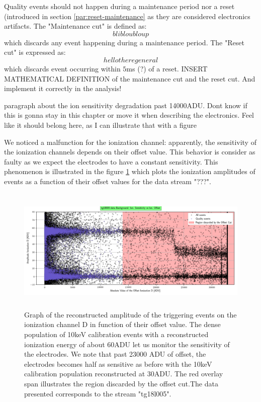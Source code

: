 Quality events should not happen during a maintenance period nor a reset (introduced in section \ref{par:reset-maintenance} as they are considered electronics artifacts. The "Maintenance cut" is defined as:
$$ bli blou bloup$$
which discards any event happening during a maintenance period.
The "Reset cut" is expressed as:
$$ hello there general$$
which discards event occurring within $5$ms (?) of a reset. 
{\color{red} INSERT MATHEMATICAL DEFINITION of the maintenance cut and the reset cut. And implement it correctly in the analysis! }

{\color{red} paragraph about the ion sensitivity degradation past 14000ADU. Dont know if this is gonna stay in this chapter or move it when describing the electronics. Feel like it should belong here, as I can illustrate that with a figure}

We noticed a malfunction for the ionization channel: apparently, the sensitivity of the ionization channels depends on their offset value. This behavior is consider as faulty as we expect the electrodes to have a constant sensitivity. This phenomenon is illustrated in the figure \ref{fig:offset-problem} which plots the ionization amplitudes of events as a function of their offset values for the data stream "???".

\begin{figure}
\centering
\includegraphics[width=\linewidth, height=6cm]{Figures/Neutron/offset_cut.png}
\caption{Graph of the reconstructed amplitude of the triggering events on the ionization channel D in function of their offset value. The dense population of 10keV calibration events with a reconstructed ionization energy of about 60ADU let us monitor the sensitivity of the electrodes. We note that past 23000 ADU of offset, the electrodes becomes half as sensitive as before with the 10keV calibration population reconstructed at 30ADU. The red overlay span illustrates the region discarded by the offset cut.The data presented corresponds to the stream "tg18l005". }
\label{fig:offset-problem}
\end{figure}

